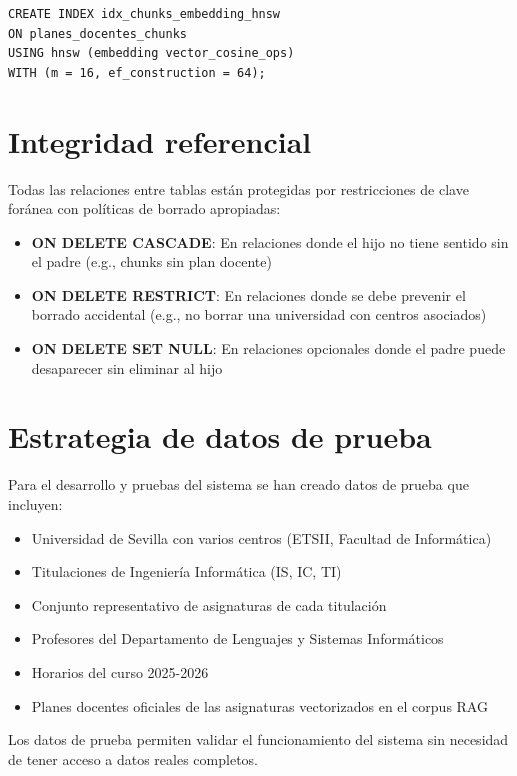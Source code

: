\begin{verbatim}
CREATE INDEX idx_chunks_embedding_hnsw
ON planes_docentes_chunks
USING hnsw (embedding vector_cosine_ops)
WITH (m = 16, ef_construction = 64);
\end{verbatim}

\section{Integridad referencial}\label{sec:integridad}

Todas las relaciones entre tablas están protegidas por restricciones de clave foránea con políticas de borrado apropiadas:

\begin{itemize}
    \item \textbf{ON DELETE CASCADE}: En relaciones donde el hijo no tiene sentido sin el padre (e.g., chunks sin plan docente)
    \item \textbf{ON DELETE RESTRICT}: En relaciones donde se debe prevenir el borrado accidental (e.g., no borrar una universidad con centros asociados)
    \item \textbf{ON DELETE SET NULL}: En relaciones opcionales donde el padre puede desaparecer sin eliminar al hijo
\end{itemize}

\section{Estrategia de datos de prueba}\label{sec:datos-prueba}

Para el desarrollo y pruebas del sistema se han creado datos de prueba que incluyen:

\begin{itemize}
    \item Universidad de Sevilla con varios centros (ETSII, Facultad de Informática)
    \item Titulaciones de Ingeniería Informática (IS, IC, TI)
    \item Conjunto representativo de asignaturas de cada titulación
    \item Profesores del Departamento de Lenguajes y Sistemas Informáticos
    \item Horarios del curso 2025-2026
    \item Planes docentes oficiales de las asignaturas vectorizados en el corpus RAG
\end{itemize}

Los datos de prueba permiten validar el funcionamiento del sistema sin necesidad de tener acceso a datos reales completos.
